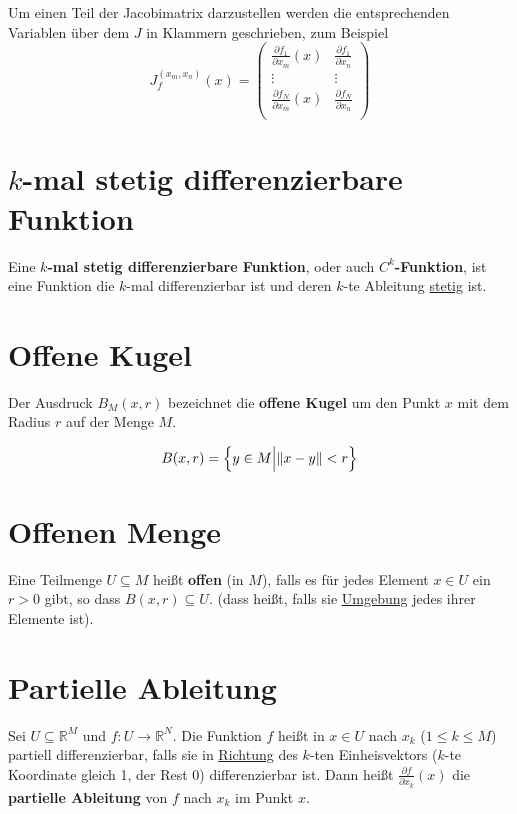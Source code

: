 \documentclass{scrreprt}
\begin{document}
Um einen Teil der Jacobimatrix darzustellen werden die entsprechenden Variablen
über dem $J$ in Klammern geschrieben, zum Beispiel
\[
  J_f^{(x_m, x_n)}(x) = \begin{pmatrix}
    \frac{\partial f_1}{\partial x_m} (x) & \frac{\partial f_1}{\partial x_n} \\
    \vdots & \vdots \\
    \frac{\partial f_N}{\partial x_m} (x) & \frac{\partial f_N}{\partial x_n} \\
  \end{pmatrix}
\]

\section{$k$-mal stetig differenzierbare Funktion}
\label{sec:c-k-funktion}

Eine \textbf{$k$-mal stetig differenzierbare Funktion}, oder auch
\textbf{$C^k$-Funktion}, ist eine Funktion die $k$-mal differenzierbar ist
und deren $k$-te Ableitung \hyperref[sec:stetige_funktion]{stetig} ist.

\newpage
\section{Offene Kugel}
\label{sec:offene_kugel}

Der Ausdruck $B_M(x, r)$ bezeichnet die \textbf{offene Kugel} um den
Punkt $x$ mit dem Radius $r$ auf der Menge $M$.

\[
  B(x, r) = \qty\Big{y \in M {\Big |} \norm{x - y} < r}
\]

\section{Offenen Menge}
\label{sec:offene_menge}

Eine Teilmenge $U \subseteq M$ heißt \textbf{offen} (in $M$), falls es für
jedes Element $x \in U$ ein $r > 0$ gibt, so dass
$\hyperref[sec:offene_kugel]{B(x, r)} \subseteq U$.
(dass heißt, falls sie \hyperref[sec:umgebung]{Umgebung} jedes ihrer Elemente
ist).

\section{Partielle Ableitung}
\label{sec:partielle_ableitung}

Sei $U \subseteq \mathbb{R}^M$ und $f \colon U \to \mathbb{R}^N$.
Die Funktion $f$ heißt in $x \in U$ nach $x_k$ ($1 \leq k \leq M$)
partiell differenzierbar, falls sie in
\hyperref[sec:richtungsableitung]{Richtung} des $k$-ten Einheisvektors
($k$-te Koordinate gleich 1, der Rest 0) differenzierbar ist.
Dann heißt $\frac{\partial f}{\partial x_k} (x)$ die
\textbf{partielle Ableitung} von $f$ nach $x_k$ im Punkt $x$.
\end{document}
